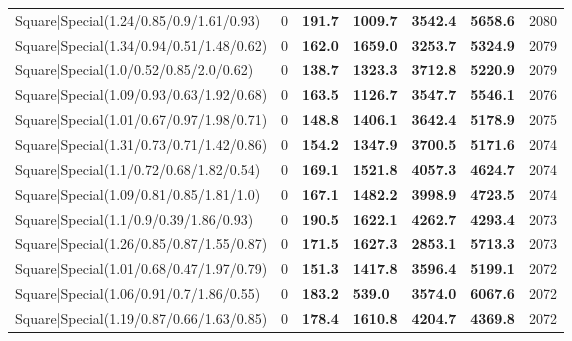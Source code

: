 \begin{tabular}{lrllllr}
 Square|Special(1.24/0.85/0.9/1.61/0.93)                       &             0   & \textbf{191.7} & \textbf{1009.7} & \textbf{3542.4} & \textbf{5658.6} &         2080 \\
 Square|Special(1.34/0.94/0.51/1.48/0.62)                      &             0   & \textbf{162.0} & \textbf{1659.0} & \textbf{3253.7} & \textbf{5324.9} &         2079 \\
 Square|Special(1.0/0.52/0.85/2.0/0.62)                        &             0   & \textbf{138.7} & \textbf{1323.3} & \textbf{3712.8} & \textbf{5220.9} &         2079 \\
 Square|Special(1.09/0.93/0.63/1.92/0.68)                      &             0   & \textbf{163.5} & \textbf{1126.7} & \textbf{3547.7} & \textbf{5546.1} &         2076 \\
 Square|Special(1.01/0.67/0.97/1.98/0.71)                      &             0   & \textbf{148.8} & \textbf{1406.1} & \textbf{3642.4} & \textbf{5178.9} &         2075 \\
 Square|Special(1.31/0.73/0.71/1.42/0.86)                      &             0   & \textbf{154.2} & \textbf{1347.9} & \textbf{3700.5} & \textbf{5171.6} &         2074 \\
 Square|Special(1.1/0.72/0.68/1.82/0.54)                       &             0   & \textbf{169.1} & \textbf{1521.8} & \textbf{4057.3} & \textbf{4624.7} &         2074 \\
 Square|Special(1.09/0.81/0.85/1.81/1.0)                       &             0   & \textbf{167.1} & \textbf{1482.2} & \textbf{3998.9} & \textbf{4723.5} &         2074 \\
 Square|Special(1.1/0.9/0.39/1.86/0.93)                        &             0   & \textbf{190.5} & \textbf{1622.1} & \textbf{4262.7} & \textbf{4293.4} &         2073 \\
 Square|Special(1.26/0.85/0.87/1.55/0.87)                      &             0   & \textbf{171.5} & \textbf{1627.3} & \textbf{2853.1} & \textbf{5713.3} &         2073 \\
 Square|Special(1.01/0.68/0.47/1.97/0.79)                      &             0   & \textbf{151.3} & \textbf{1417.8} & \textbf{3596.4} & \textbf{5199.1} &         2072 \\
 Square|Special(1.06/0.91/0.7/1.86/0.55)                       &             0   & \textbf{183.2} & \textbf{539.0}  & \textbf{3574.0} & \textbf{6067.6} &         2072 \\
 Square|Special(1.19/0.87/0.66/1.63/0.85)                      &             0   & \textbf{178.4} & \textbf{1610.8} & \textbf{4204.7} & \textbf{4369.8} &         2072 \\

\end{tabular}
